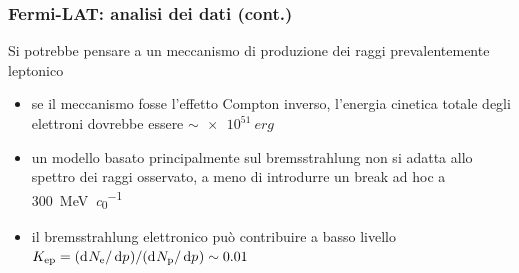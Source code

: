 \documentclass[10pt]{beamer}
\newcommand*{\dd}{\mathop{}\!\textup{d}} %
\newcommand*{\toder}[3][]{\frac{{\dd^{#1}}#2}{\dd {#3}^{#1}}}
\newcommand*{\ltoder}[3][]{{\dd^{#1}}#2/\dd {#3}^{#1}}
\newcommand{\pro}{\color{alerted text.fg}{\ding{51}}}
\newcommand{\con}{\color{alerted text.fg}{\ding{55}}}
\begin{document}

\begin{frame}
  \frametitle{Fermi-LAT: analisi dei dati (cont.)}
  Si potrebbe pensare a un meccanismo di produzione dei raggi \PGg
  prevalentemente leptonico
  \begin{itemize}
  \item[\con] se il meccanismo fosse l'effetto Compton inverso, l'energia
    cinetica totale degli elettroni dovrebbe essere $\sim \SI{e51}{erg}$
  \item[\con] un modello basato principalmente sul bremsstrahlung non si adatta
    allo spettro dei raggi \PGg osservato, a meno di introdurre un break ad hoc
    a \SI{300}{\mega\electronvolt\per\clight}
  \item[\pro] il bremsstrahlung elettronico può contribuire a basso livello
    $K_{\textup{ep}} = (\ltoder{N_{\textup{e}}}{p})/(\ltoder{N_{\textup{p}}}{p})
    \sim 0.01$
  \end{itemize}
\end{frame}
\end{document}
